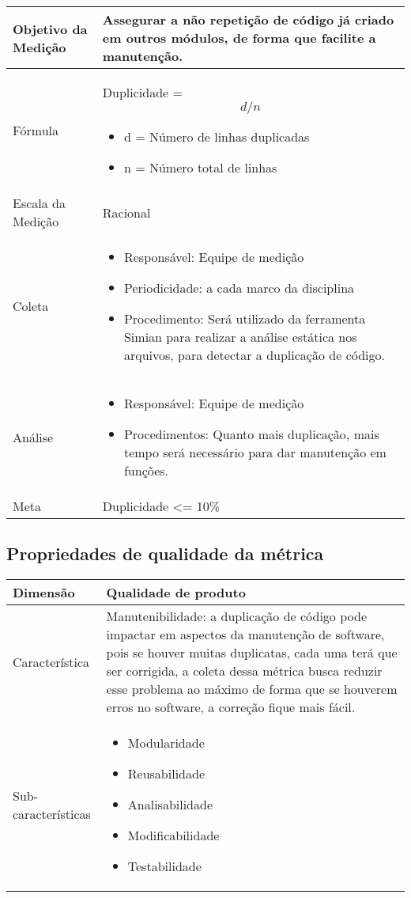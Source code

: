 	\begin{tabular}{ |p{4cm}|p{8cm}|  }
	 \hline
	 Objetivo da Medição 		& 	Assegurar a não repetição de código já criado em outros módulos, de forma que facilite a manutenção.   \\
	 \hline
	 Fórmula		& 	Duplicidade = \[d / n\]	\begin{itemize} \item d = Número de linhas duplicadas \item n = Número total de linhas \end{itemize}\\
	 \hline
	 Escala da Medição 		& Racional		 \\
	 \hline
	 Coleta		& 	\begin{itemize} \item Responsável: Equipe de medição \item Periodicidade: a cada marco da disciplina \item Procedimento: Será utilizado da ferramenta Simian para realizar a análise estática nos arquivos, para detectar a duplicação de código.\end{itemize}	\\
	 \hline
	 Análise		& 	\begin{itemize} \item Responsável: Equipe de medição \item Procedimentos: Quanto mais duplicação, mais tempo será necessário para dar manutenção em funções. \end{itemize}	 \\
	 \hline
	 Meta		& 	Duplicidade <= 10\%	 \\
	 \hline
	\end{tabular}

	\subsection{Propriedades de qualidade da métrica}

	\begin{tabular}{ |p{4cm}|p{8cm}| }
		\hline
	   Dimensão 		& 	Qualidade de produto	 \\
	 \hline
	 Característica 		& 	Manutenibilidade: a duplicação de código pode impactar em aspectos da manutenção de software, pois se houver muitas duplicatas, cada uma terá que ser corrigida, a coleta dessa métrica busca reduzir esse problema ao máximo de forma que se houverem erros no software, a correção fique mais fácil.	 \\
	 \hline
	 Sub-características 		& 	\begin{itemize} \item Modularidade \item Reusabilidade \item Analisabilidade \item Modificabilidade \item Testabilidade  \end{itemize} \\
	 \hline
	\end{tabular}

